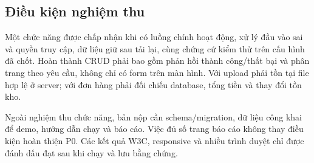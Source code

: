 \subsection{Điều kiện nghiệm thu}
Một chức năng được chấp nhận khi có luồng chính hoạt động, xử lý đầu vào sai và quyền truy cập, dữ liệu giữ sau tải lại, cùng chứng cứ kiểm thử trên cấu hình đã chốt. Hoàn thành CRUD phải bao gồm phản hồi thành công/thất bại và phân trang theo yêu cầu, không chỉ có form trên màn hình. Với upload phải tồn tại file hợp lệ ở server; với đơn hàng phải đối chiếu database, tổng tiền và thay đổi tồn kho.

Ngoài nghiệm thu chức năng, bản nộp cần schema/migration, dữ liệu công khai để demo, hướng dẫn chạy và báo cáo. Việc đủ số trang báo cáo không thay điều kiện hoàn thiện P0. Các kết quả W3C, responsive và nhiều trình duyệt chỉ được đánh dấu đạt sau khi chạy và lưu bằng chứng.
\clearpage
